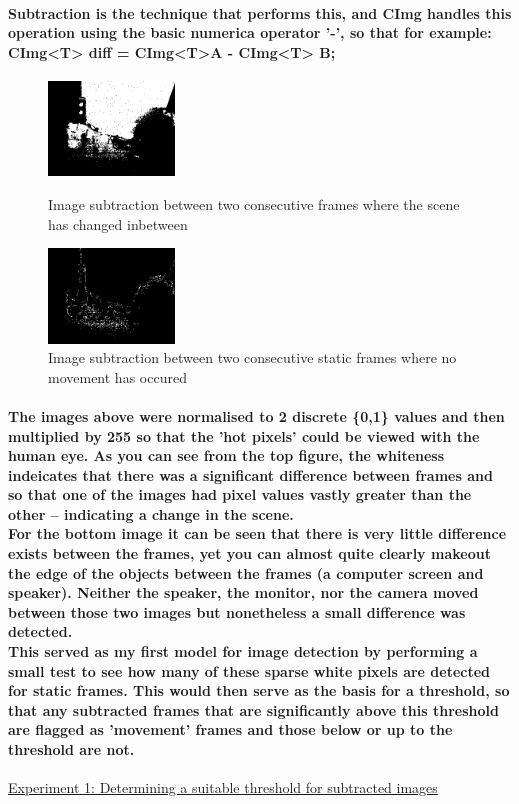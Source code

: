 \documentclass[11pt]{article} %
\begin{document}
\paragraph{Subtraction is the technique that performs this, and CImg handles this operation using the basic numerica operator '-', so that for example: CImg<T> diff = CImg<T>A - CImg<T> B;
}
\begin{figure}
	\vspace{-20pt}
	\begin{center}
		\includegraphics[width=0.3\textwidth]{images/subG}
	\end{center}
	\vspace{-20pt}
	\caption{Image subtraction between two consecutive frames where the scene has changed inbetween}
	\vspace{10pt}
	\begin{center}
		\includegraphics[width=0.3\textwidth]{images/subF}
	\end{center}
	\vspace{-20pt}
	\caption{Image subtraction between two consecutive static frames where no movement has occured}
\end{figure}
\paragraph{The images above were normalised to 2 discrete \{0,1\} values and then multiplied by 255 so that the 'hot pixels' could be viewed with the human eye. As you can see from the top figure, the whiteness indeicates that there was a significant difference between frames and so that one of the images had pixel values vastly greater than the other -- indicating a change in the scene.
\\For the bottom image it can be seen that there is very little difference exists between the frames, yet you can almost quite clearly makeout the edge of the objects between the frames (a computer screen and speaker). Neither the speaker, the monitor, nor the camera moved between those two images but nonetheless a small difference was detected.\\
This served as my first model for image detection by performing a small test to see how many of these sparse white pixels are detected for static frames. This would then serve as the basis for a threshold, so that any subtracted frames that are significantly above this threshold are flagged as 'movement' frames and those below or up to the threshold 
are not.}
\underline{Experiment 1: Determining a suitable threshold for subtracted images}
\end{document}
